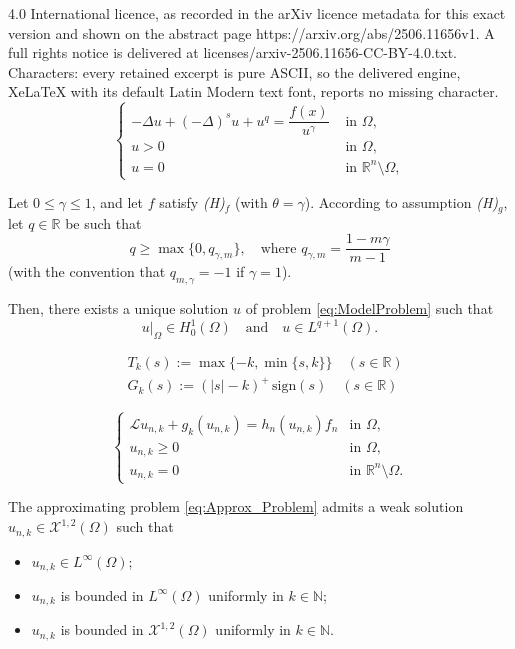 \documentclass[10pt,a4paper]{amsart}
\begin{document}
4.0 International licence, as recorded in the arXiv licence metadata for this exact version and shown on the abstract page https://arxiv.org/abs/2506.11656v1. A full rights notice is delivered at licenses/arxiv-2506.11656-CC-BY-4.0.txt. Characters: every retained excerpt is pure ASCII, so the delivered engine, XeLaTeX with its default Latin Modern text font, reports no missing character.
\begin{equation}\label{eq:ModelProblem}
\left\{ \begin{array}{rl}
-\Delta u + (-\Delta)^s u + u^q = \dfrac{f(x)}{u^{\gamma}} & \textrm{ in } \Omega,\\
u>0 & \textrm{ in } \Omega,\\
u=0 & \textrm{ in } \mathbb{R}^{n}\setminus \Omega,
\end{array}\right.
\end{equation}

\begin{corollary} \label{cor:ModelProblemEU}
	Let $0\leq \gamma\leq 1$, and let $f$ satisfy
	\emph{(H)}$_f$ (with $\theta = \gamma$). According to assumption \emph{(H)}$_g$,  let $q\in\mathbb{R}$ be such that
	$$q\geq \max\{0,q_{\gamma,m}\}, \quad\text{where $q_{\gamma,m}
	= \frac{1-m\gamma}{m-1}$}$$
	(with the convention that $q_{m,\gamma} = -1$ if $\gamma = 1$).
	
	Then, there exists a unique solution $u$ of problem \eqref{eq:ModelProblem} such that
	$$u|_\Omega\in H_0^1(\Omega)\quad\text{and}\quad u\in L^{q+1}(\Omega).$$
\end{corollary}

\begin{align}
& T_{k}(s):= \max \{ -k, \min\{s,k\}\} \quad (s \in \mathbb{R}) \label{eq:def_Tk} \\
& G_{k}(s):= (|s|-k)^{+} \, \mathrm{sign}(s) \quad (s\in \mathbb{R}) \label{eq:def_Gk}
\end{align}

\begin{equation}\label{eq:Approx_Problem}
\left\{ \begin{array}{rl}
\mathcal{L}u_{n,k} + g_{k}(u_{n,k}) = h_n(u_{n,k})f_n & \textrm{in } \Omega,\\
u_{n,k} \geq 0 & \textrm{in } \Omega,\\
u_{n,k} = 0 & \textrm{in } \mathbb{R}^{n}\setminus \Omega.\end{array}\right.
\end{equation}  

\begin{lemma}\label{lem:First_Approx}
The approximating problem \eqref{eq:Approx_Problem} admits a weak solution $u_{n,k}\in \mathcal{X}^{1,2}(\Omega)$ such that
\begin{itemize}
\item[i)] $u_{n,k}\in L^{\infty}(\Omega)$;
\item[ii)] $u_{n,k}$ is bounded in $L^{\infty}(\Omega)$ uniformly in $k\in\mathbb{N}$;
\item[iii)] $u_{n,k}$ is bounded in $\mathcal{X}^{1,2}(\Omega)$ uniformly in $k\in\mathbb{N}$.
\end{itemize}
\end{lemma}  
\end{document}
